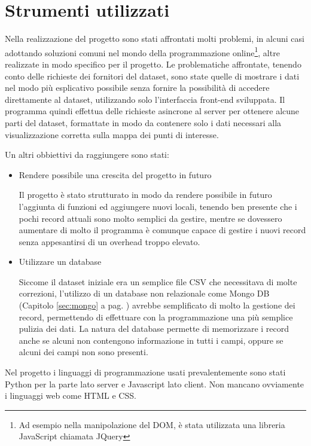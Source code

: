 \chapter{Strumenti utilizzati}
Nella realizzazione del progetto sono stati affrontati molti problemi, in alcuni casi adottando soluzioni comuni nel mondo della programmazione online\footnote{Ad esempio nella manipolazione del DOM, è stata utilizzata una libreria JavaScript chiamata JQuery}, altre realizzate in modo specifico per il progetto. Le problematiche affrontate, tenendo conto delle richieste dei fornitori del dataset, sono state quelle di mostrare i dati nel modo più esplicativo possibile senza fornire la possibilità di accedere direttamente al dataset, utilizzando solo l'interfaccia front-end sviluppata. Il programma quindi effettua delle richieste asincrone al server per ottenere alcune parti del dataset, formattate in modo da contenere solo i dati necessari alla visualizzazione corretta sulla mappa dei punti di interesse.

Un altri obbiettivi da raggiungere sono stati:
\begin{itemize}
	\item Rendere possibile una crescita del progetto in futuro

Il progetto è stato strutturato in modo da rendere possibile in futuro l'aggiunta di funzioni ed aggiungere nuovi locali, tenendo ben presente che i pochi record attuali sono molto semplici da gestire, mentre se dovessero aumentare di molto il programma è comunque capace di gestire i nuovi record senza appesantirsi di un overhead troppo elevato.

	\item Utilizzare un database

Siccome il dataset iniziale era un semplice file CSV che necessitava di molte correzioni, l'utilizzo di un database non relazionale come Mongo DB (Capitolo \ref{sec:mongo} a pag. \pageref{sec:mongo} ) avrebbe semplificato di molto la gestione dei record, permettendo di effettuare con la programmazione una più semplice pulizia dei dati. La natura del database permette di memorizzare i record anche se alcuni non contengono informazione in tutti i campi, oppure se alcuni dei campi non sono presenti.

\end{itemize}

Nel progetto i linguaggi di programmazione usati prevalentemente sono stati Python per la parte lato server e Javascript lato client. Non mancano ovviamente i linguaggi web come HTML e CSS.

